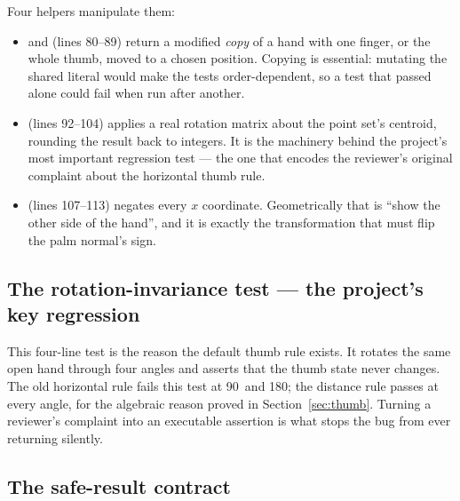 Four helpers manipulate them:

\begin{codecard}

\end{codecard}

\begin{itemize}
  \item {} and  (lines 80--89) return a modified \emph{copy}
        of a hand with one finger, or the whole thumb, moved to a chosen position. Copying is
        essential: mutating the shared literal would make the tests order-dependent, so a test that
        passed alone could fail when run after another.
  \item {} (lines 92--104) applies a real rotation matrix about the point set's
        centroid, rounding the result back to integers. It is the machinery behind the project's most
        important regression test --- the one that encodes the reviewer's original complaint about
        the horizontal thumb rule.
  \item {} (lines 107--113) negates every $x$ coordinate. Geometrically that is
        ``show the other side of the hand'', and it is exactly the transformation that must flip the
        palm normal's sign.
\end{itemize}

\subsection{The rotation-invariance test --- the project's key regression}

\begin{codecard}

\end{codecard}

This four-line test is the reason the default thumb rule exists. It rotates the same open hand
through four angles and asserts that the thumb state never changes. The old horizontal rule fails
this test at 90\textdegree\ and 180\textdegree; the distance rule passes at every angle, for the
algebraic reason proved in Section~\ref{sec:thumb}. Turning a reviewer's complaint into an executable
assertion is what stops the bug from ever returning silently.

\subsection{The safe-result contract}

